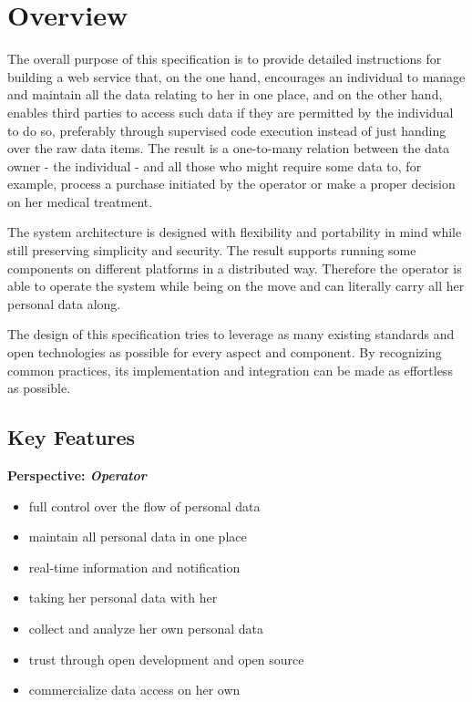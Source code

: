 \documentclass[12pt,english,a4paper,titlepage,cleardoublepage=empty,dottedtoc]{report}
\providecommand{\tightlist}{%
  \setlength{\itemsep}{0pt}\setlength{\parskip}{0pt}}
\begin{document}
\section{Overview}\label{overview}

The overall purpose of this specification is to provide detailed
instructions for building a web service that, on the one hand,
encourages an individual to manage and maintain all the data relating to
her in one place, and on the other hand, enables third parties to access
such data if they are permitted by the individual to do so, preferably
through supervised code execution instead of just handing over the raw
data items. The result is a one-to-many relation between the data owner
- the individual - and all those who might require some data to, for
example, process a purchase initiated by the operator or make a proper
decision on her medical treatment.

The system architecture is designed with flexibility and portability in
mind while still preserving simplicity and security. The result supports
running some components on different platforms in a distributed way.
Therefore the operator is able to operate the system while being on the
move and can literally carry all her personal data along.

The design of this specification tries to leverage as many existing
standards and open technologies as possible for every aspect and
component. By recognizing common practices, its implementation and
integration can be made as effortless as possible.

\subsection{Key Features}\label{key-features}

\textbf{Perspective: \emph{Operator}}

\begin{itemize}
\tightlist
\item
  full control over the flow of personal data
\item
  maintain all personal data in one place
\item
  real-time information and notification
\item
  taking her personal data with her
\item
  collect and analyze her own personal data
\item
  trust through open development and open source
\item
  commercialize data access on her own
\end{itemize}
\end{document}

